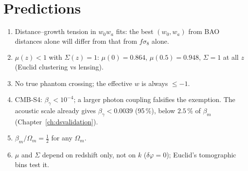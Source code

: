 \section{Predictions}
\begin{enumerate}
\item Distance--growth tension in $w_0w_a$ fits: the best $(w_0,w_a)$ from BAO distances alone will differ from that from $f\sigma_8$ alone.
\item $\mu(z)<1$ with $\Sigma(z)=1$: $\mu(0)=0.864$, $\mu(0.5)=0.948$, $\Sigma=1$ at all $z$ (Euclid clustering vs lensing).
\item No true phantom crossing; the effective $w$ is always $\le-1$.
\item CMB-S4: $\beta_\gamma<10^{-4}$; a larger photon coupling falsifies the exemption. The acoustic scale already gives $\beta_\gamma<0.0039$ (95\,\%), below $2.5\,\%$ of $\beta_m$ (Chapter~\ref{ch:dsvalidation}).
\item $\beta_m/\Omega_m=\tfrac12$ for any $\Omega_m$.
\item $\mu$ and $\Sigma$ depend on redshift only, not on $k$ ($\delta\varphi=0$); Euclid's tomographic bins test it.
\end{enumerate}
